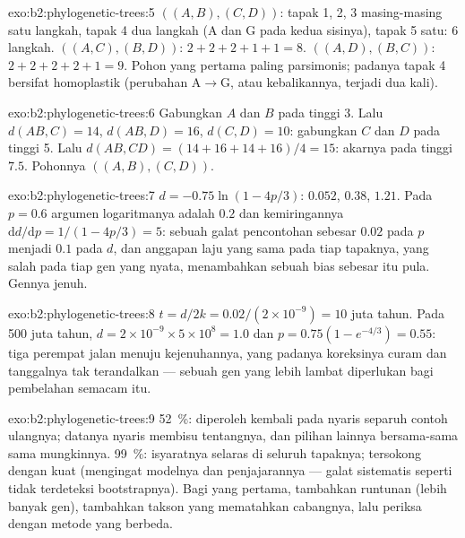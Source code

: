 \begin{solution}{exo:b2:phylogenetic-trees:5}
$((A,B),(C,D))$: tapak 1, 2, 3 masing-masing satu langkah, tapak 4 dua
langkah ($\mathrm{A}$ dan $\mathrm{G}$ pada kedua sisinya), tapak 5
satu: 6 langkah. $((A,C),(B,D))$: $2 + 2 + 2 + 1 + 1 = 8$.
$((A,D),(B,C))$: $2 + 2 + 2 +
2 + 1 = 9$. Pohon yang pertama paling
parsimonis; padanya tapak 4 bersifat homoplastik (perubahan
$\mathrm{A}\to\mathrm{G}$, atau kebalikannya, terjadi dua kali).
\end{solution}

\begin{solution}{exo:b2:phylogenetic-trees:6}
Gabungkan $A$ dan $B$ pada tinggi 3. Lalu $d(AB,C) = 14$, $d(AB,D) = 16$,
$d(C,D) = 10$: gabungkan $C$ dan $D$ pada tinggi 5. Lalu $d(AB,CD) = (14 + 16
+ 14 + 16)/4 = 15$: akarnya pada tinggi $7.5$. Pohonnya $((A,B),(C,D))$.
\end{solution}

\begin{solution}{exo:b2:phylogenetic-trees:7}
$d = -0.75\ln(1 - 4p/3)$: $0.052$, $0.38$, $1.21$. Pada $p = 0.6$
argumen logaritmanya adalah $0.2$ dan kemiringannya $\mathrm{d}d/\mathrm{d}p
= 1/(1 - 4p/3) = 5$: sebuah galat pencontohan sebesar $0.02$ pada $p$
menjadi $0.1$ pada $d$, dan anggapan laju yang sama pada tiap tapaknya,
yang salah pada tiap gen yang nyata, menambahkan sebuah bias sebesar
itu pula. Gennya jenuh.
\end{solution}

\begin{solution}{exo:b2:phylogenetic-trees:8}
$t = d/2k = 0.02/(2\times 10^{-9}) = 10$ juta tahun. Pada 500 juta
tahun, $d = 2\times 10^{-9}\times 5\times 10^{8} = 1.0$ dan
$p = 0.75(1 - e^{-4/3}) = 0.55$: tiga perempat jalan menuju
kejenuhannya, yang padanya koreksinya curam dan tanggalnya tak
terandalkan --- sebuah gen yang lebih lambat diperlukan bagi pembelahan
semacam itu.
\end{solution}

\begin{solution}{exo:b2:phylogenetic-trees:9}
\qty{52}{\%}:  diperoleh kembali pada nyaris separuh contoh
ulangnya; datanya nyaris membisu tentangnya, dan pilihan lainnya
bersama-sama sama mungkinnya. \qty{99}{\%}: isyaratnya selaras di
seluruh tapaknya;  tersokong dengan kuat (mengingat modelnya dan
penjajarannya --- galat sistematis seperti  tidak
terdeteksi bootstrapnya). Bagi yang pertama, tambahkan runtunan (lebih
banyak gen), tambahkan takson yang mematahkan cabangnya, lalu periksa
dengan metode yang berbeda.
\end{solution}

